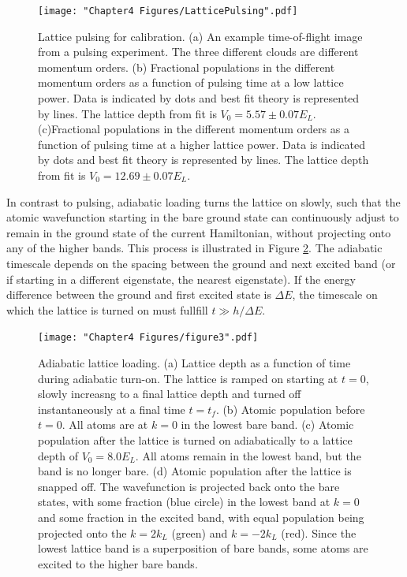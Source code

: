 \begin{figure}
	\texttt{[image: "Chapter4 Figures/LatticePulsing".pdf]}
\caption{Lattice pulsing for calibration. (a) An example time-of-flight image from a pulsing experiment. The three different clouds are different momentum orders. (b) Fractional populations in the different momentum orders as a function of pulsing time at a low lattice power. Data is indicated by dots and best fit theory is represented by lines. The lattice depth from fit is $V_0=5.57\pm0.07 E_L$. (c)Fractional populations in the different momentum orders as a function of pulsing time at a higher lattice power. Data is indicated by dots and best fit theory is represented by lines. The lattice depth from fit is $V_0=12.69\pm0.07 E_L$. }
\label{fig:latticePulsing}
\end{figure}

In contrast to pulsing, adiabatic loading turns the lattice on slowly, such that the atomic wavefunction starting in the bare ground state can continuously adjust to remain in the ground state of the current Hamiltonian, without projecting onto any of the higher bands. This process is illustrated in Figure \ref{fig:pulsingSchematic}. The adiabatic timescale depends on the spacing between the ground and next excited band (or if starting in a different eigenstate, the nearest eigenstate). If the energy difference between the ground and first excited state is $\Delta E$, the timescale on which the lattice is turned on must fullfill $t \gg h/\Delta E$.  

\begin{figure}
\texttt{[image: "Chapter4 Figures/figure3".pdf]}
\caption{Adiabatic lattice loading. (a) Lattice depth as a function of time during adiabatic turn-on. The lattice is ramped on starting at $t=0$, slowly increasng to a final lattice depth and turned off instantaneously at a final time $t=t_f$. (b) Atomic population before $t=0$. All atoms are at $k=0$ in the lowest bare band. (c) Atomic population after the lattice is turned on adiabatically to a lattice depth of $V_0 = 8.0 E_L$. All atoms remain in the lowest band, but the band is no longer bare. (d) Atomic population after the lattice is snapped off. The wavefunction is projected back onto the bare states, with some fraction (blue circle) in the lowest band at $k=0$ and some fraction in the excited band, with equal population being projected onto the $k = 2 k_L$ (green) and $k=-2k_L$ (red). Since the lowest lattice band is a superposition of bare bands, some atoms are excited to the higher bare bands. }
\label{fig:pulsingSchematic}
\end{figure}


